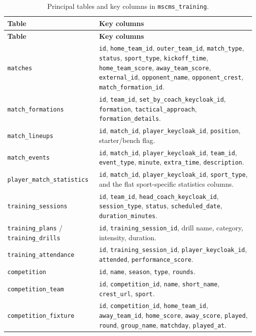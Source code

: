 \begin{longtable}{p{} p{}}
\caption{Principal tables and key columns in \texttt{mscms\_training}.}
\label{tab:schema-training}\\
\toprule
\textbf{Table} & \textbf{Key columns} \\
\midrule
\endfirsthead
\toprule
\textbf{Table} & \textbf{Key columns} \\
\midrule
\endhead
\bottomrule
\endlastfoot
\texttt{matches} & \texttt{id}, \texttt{home\_team\_id}, \texttt{outer\_team\_id}, \texttt{match\_type}, \texttt{status}, \texttt{sport\_type}, \texttt{kickoff\_time}, \texttt{home\_team\_score}, \texttt{away\_team\_score}, \texttt{external\_id}, \texttt{opponent\_name}, \texttt{opponent\_crest}, \texttt{match\_formation\_id}. \\
\texttt{match\_formations} & \texttt{id}, \texttt{team\_id}, \texttt{set\_by\_coach\_keycloak\_id}, \texttt{formation}, \texttt{tactical\_approach}, \texttt{formation\_details}. \\
\texttt{match\_lineups} & \texttt{id}, \texttt{match\_id}, \texttt{player\_keycloak\_id}, \texttt{position}, starter/bench flag. \\
\texttt{match\_events} & \texttt{id}, \texttt{match\_id}, \texttt{player\_keycloak\_id}, \texttt{team\_id}, \texttt{event\_type}, \texttt{minute}, \texttt{extra\_time}, \texttt{description}. \\
\texttt{player\_match\_statistics} & \texttt{id}, \texttt{match\_id}, \texttt{player\_keycloak\_id}, \texttt{sport\_type}, and the flat sport-specific statistics columns. \\
\texttt{training\_sessions} & \texttt{id}, \texttt{team\_id}, \texttt{head\_coach\_keycloak\_id}, \texttt{session\_type}, \texttt{status}, \texttt{scheduled\_date}, \texttt{duration\_minutes}. \\
\texttt{training\_plans} / \texttt{training\_drills} & \texttt{id}, \texttt{training\_session\_id}, drill name, category, intensity, duration. \\
\texttt{training\_attendance} & \texttt{id}, \texttt{training\_session\_id}, \texttt{player\_keycloak\_id}, \texttt{attended}, \texttt{performance\_score}. \\
\texttt{competition} & \texttt{id}, \texttt{name}, \texttt{season}, \texttt{type}, \texttt{rounds}. \\
\texttt{competition\_team} & \texttt{id}, \texttt{competition\_id}, \texttt{name}, \texttt{short\_name}, \texttt{crest\_url}, \texttt{sport}. \\
\texttt{competition\_fixture} & \texttt{id}, \texttt{competition\_id}, \texttt{home\_team\_id}, \texttt{away\_team\_id}, \texttt{home\_score}, \texttt{away\_score}, \texttt{played}, \texttt{round}, \texttt{group\_name}, \texttt{matchday}, \texttt{played\_at}. \\
\end{longtable}

